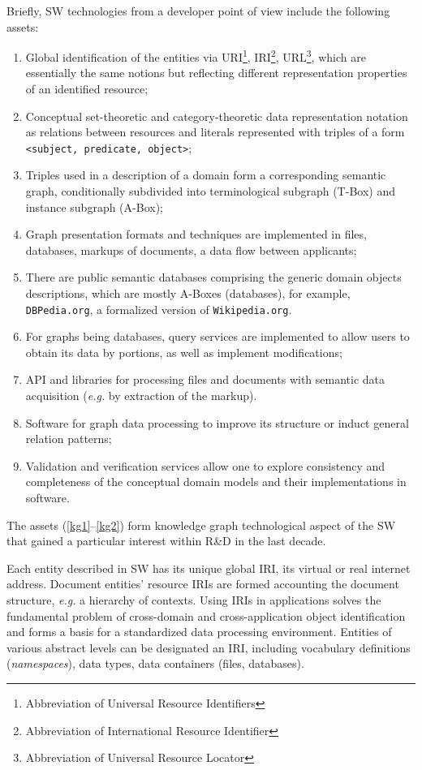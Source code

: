 \documentclass[
]{ceurart}
\begin{document}
Briefly, SW technologies from a developer point of view include the following assets:
\begin{enumerate}
\item Global identification of the entities via URI\footnote{Abbreviation of Universal Resource Identifiers}, IRI\footnote{Abbreviation of International Resource Identifier}, URL\footnote{Abbreviation of Universal Resource Locator}, which are essentially the same notions but reflecting different representation properties of an identified resource;
\item Conceptual set-theoretic and category-theoretic data representation notation as relations between resources and literals represented with triples of a form \texttt{<subject, predicate, object>};
\item Triples used in a description of a domain form a corresponding semantic graph, conditionally subdivided into terminological subgraph (T-Box) and instance subgraph (A-Box);
\item Graph presentation formats and techniques are implemented in files, databases, markups of documents, a data flow between applicants; \label{kg1}
\item There are public semantic databases comprising the generic domain objects descriptions, which are mostly A-Boxes (databases), for example, \texttt{DBPedia.org}, a formalized version of \texttt{Wikipedia.org}. %
\item For graphs being databases, query services are implemented to allow users to obtain its data by portions, as well as implement modifications;
\item API and libraries for processing files and documents with semantic data acquisition (\emph{e.g.} by extraction of the markup).
\item Software for graph data processing to improve its structure or induct general relation patterns;
\item Validation and verification services allow one to explore consistency and completeness of the conceptual domain models and their implementations in software. \label{kg2}
\end{enumerate}
The assets  (\ref{kg1}--\ref{kg2}) form knowledge graph technological aspect of the SW that gained a particular interest within R\&D in the last decade.

Each entity described in SW has its unique global IRI, its virtual or real internet address. Document entities' resource IRIs are formed accounting the document structure, \emph{e.g.} a hierarchy of contexts. Using IRIs in applications solves the fundamental problem of cross-domain and cross-application object identification and forms a basis for a standardized data processing environment. Entities of various abstract levels can be designated an IRI, including vocabulary definitions (\emph{namespaces}), data types, data containers (files, databases).
\end{document}
